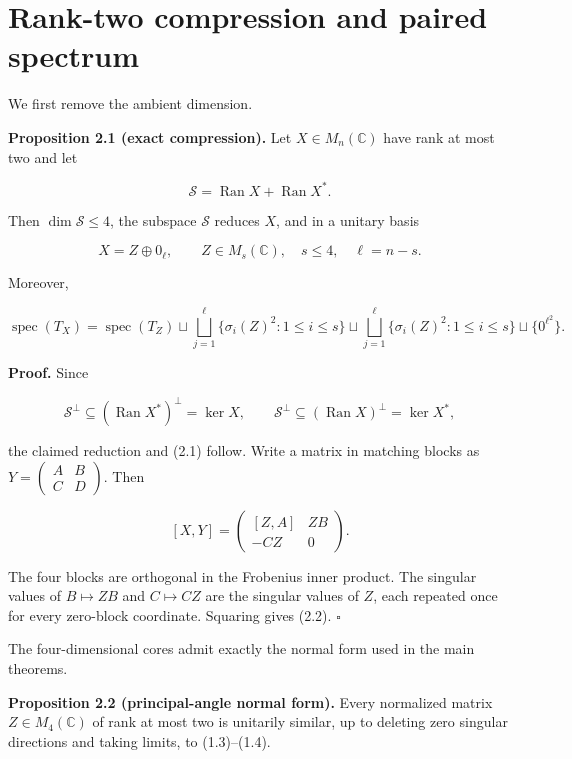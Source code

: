 \documentclass[11pt]{article}
\begin{document}
\section{Rank-two compression and paired spectrum}

We first remove the ambient dimension.

\textbf{Proposition 2.1 (exact compression).} Let $X\in M_n(\mathbb C)$ have rank at most two and let

\[
\mathcal S=\operatorname{Ran}X+\operatorname{Ran}X^*.
\]

Then $\dim\mathcal S\le4$, the subspace $\mathcal S$ reduces $X$, and in a unitary basis

\begin{equation}
X=Z\oplus0_\ell,\qquad Z\in M_s(\mathbb C),\quad s\le4,
\quad \ell=n-s.
\tag{2.1}
\end{equation}

Moreover,

\begin{equation}
\operatorname{spec}(T_X)=\operatorname{spec}(T_Z)
\sqcup\bigsqcup_{j=1}^{\ell}\{\sigma_i(Z)^2:1\le i\le s\}
\sqcup\bigsqcup_{j=1}^{\ell}\{\sigma_i(Z)^2:1\le i\le s\}
\sqcup\{0^{\ell^2}\}.
\tag{2.2}
\end{equation}

\textbf{Proof.} Since

\[
\mathcal S^\perp\subseteq(\operatorname{Ran}X^*)^\perp=\ker X,
\qquad
\mathcal S^\perp\subseteq(\operatorname{Ran}X)^\perp=\ker X^*,
\]

the claimed reduction and (2.1) follow. Write a matrix in matching blocks as $Y=\left(\begin{smallmatrix}A&B\\C&D\end{smallmatrix}\right)$. Then

\[
[X,Y]=\begin{pmatrix}[Z,A]&ZB\\-CZ&0\end{pmatrix}.
\]

The four blocks are orthogonal in the Frobenius inner product. The singular values of $B\mapsto ZB$ and $C\mapsto CZ$ are the singular values of $Z$, each repeated once for every zero-block coordinate. Squaring gives (2.2). $\square$

The four-dimensional cores admit exactly the normal form used in the main theorems.

\textbf{Proposition 2.2 (principal-angle normal form).} Every normalized matrix $Z\in M_4(\mathbb C)$ of rank at most two is unitarily similar, up to deleting zero singular directions and taking limits, to (1.3)--(1.4).
\end{document}
